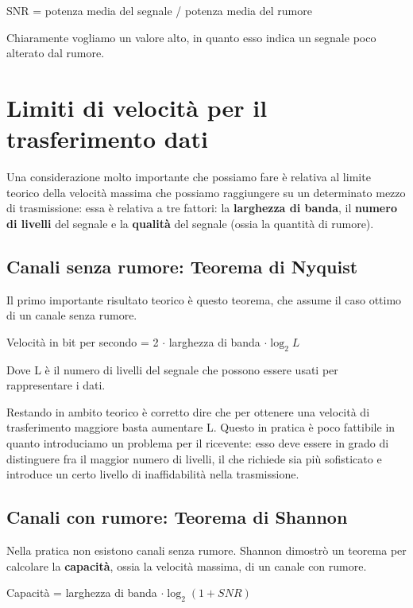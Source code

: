             \begin{center}
                SNR = potenza media del segnale / potenza media del rumore
            \end{center}
            
            Chiaramente vogliamo un valore alto, in quanto esso indica un segnale poco alterato dal rumore.
            
\section{Limiti di velocità per il trasferimento dati}
    Una considerazione molto importante che possiamo fare è relativa al limite teorico della velocità massima che possiamo raggiungere su un determinato mezzo di trasmissione: essa è relativa a tre fattori: la \textbf{larghezza di banda}, il \textbf{numero di livelli} del segnale e la \textbf{qualità} del segnale (ossia la quantità di rumore).
    
    \subsection{Canali senza rumore: Teorema di Nyquist}
        Il primo importante risultato teorico è questo teorema, che assume il caso ottimo di un canale senza rumore.
        \begin{center}
            Velocità in bit per secondo = 2 $\cdot$ larghezza di banda $\cdot \log_2L$
        \end{center}
        Dove L è il numero di livelli del segnale che possono essere usati per rappresentare i dati.
        
        Restando in ambito teorico è corretto dire che per ottenere una velocità di trasferimento maggiore basta aumentare L. Questo in pratica è poco fattibile in quanto introduciamo un problema per il ricevente: esso deve essere in grado di distinguere fra il maggior numero di livelli, il che richiede sia più sofisticato e introduce un certo livello di inaffidabilità nella trasmissione.
        
    \subsection{Canali con rumore: Teorema di Shannon}
        Nella pratica non esistono canali senza rumore. Shannon dimostrò un teorema per calcolare la \textbf{capacità}, ossia la velocità massima, di un canale con rumore.
        \begin{center}
            Capacità = larghezza di banda $\cdot \log_2(1 + SNR)$
        \end{center}
        
